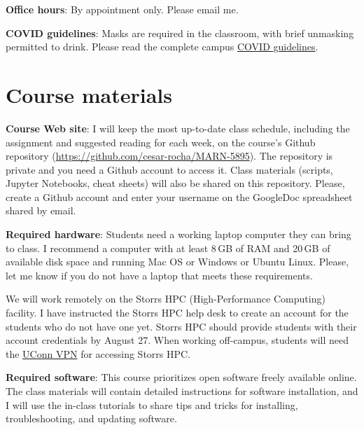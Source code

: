 \documentclass[11pt]{article}
\begin{document}
\textbf{Office hours}: By appointment only. Please email me.

\textbf{COVID guidelines}: Masks are required in the classroom, with brief unmasking permitted to drink. Please read the complete campus \href{https://covid.uconn.edu/campus-guidelines/}{COVID guidelines}.

\section*{Course materials}

\textbf{Course Web site}: I will keep the most up-to-date class schedule, including the assignment and suggested reading for each week, on the course's Github repository (\href{https://github.com/cesar-rocha/MARN-5895}{https://github.com/cesar-rocha/MARN-5895}). The repository is private and you need a Github account to access it. Class materials (scripts, Jupyter Notebooks, cheat sheets) will also be shared on this repository. Please, create a Github account and enter your username on the GoogleDoc spreadsheet shared by email.

\textbf{Required hardware}: Students need a working laptop computer they can bring to class. I recommend a computer with at least 8\,GB of RAM and 20\,GB of available disk space and running Mac OS or Windows or Ubuntu Linux.  Please, let me know if you do not have a laptop that meets these requirements. 

We will work remotely on the Storrs HPC (High-Performance Computing) facility. I have instructed the Storrs HPC help desk to create an account for the students who do not have one yet. Storrs HPC should provide students with their account credentials by August 27.  When working off-campus, students will need the \href{https://confluence.uconn.edu/ikb/remote-access/virtual-private-network-vpn/accessing-the-uconn-network-through-a-vpn-client}{UConn VPN} for accessing Storrs HPC.




\textbf{Required software}:  This course prioritizes open software freely
available online. The class materials will contain detailed instructions for software installation, and  I will use the in-class tutorials to share tips and tricks for installing, troubleshooting, and updating software.
\end{document}
